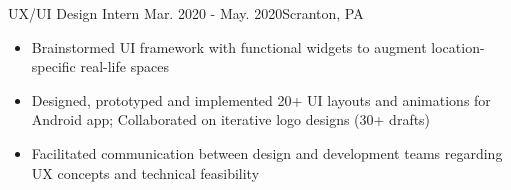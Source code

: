     {UX/UI Design Intern}
    {Mar. 2020 - May. 2020}{Scranton, PA}{}
\begin{itemize}

    \item Brainstormed UI framework with functional widgets to augment location-specific real-life spaces


    \item Designed, prototyped and implemented 20+ UI layouts and animations for Android app; Collaborated on iterative logo designs (30+ drafts)


    \item Facilitated communication between design and development teams regarding UX concepts and technical feasibility
\end{itemize}
\dividerSmall

